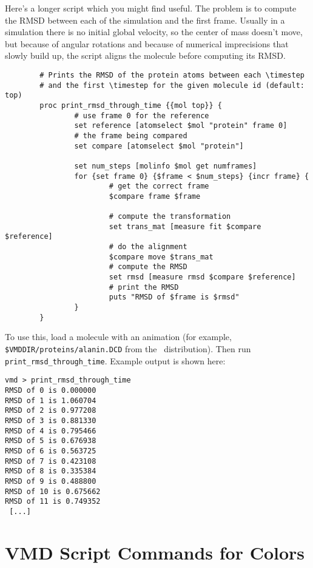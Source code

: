   Here's a longer script which you might find useful.  The problem is
to compute the RMSD between each \timestep of the simulation and the
first frame.  Usually in a simulation there is no initial global
velocity, so the center of mass doesn't move, but because of angular
rotations and because of numerical imprecisions that slowly build up,
the script aligns the molecule before computing its RMSD.

{\tt \begin{verbatim}
        # Prints the RMSD of the protein atoms between each \timestep
        # and the first \timestep for the given molecule id (default: top)
        proc print_rmsd_through_time {{mol top}} {
                # use frame 0 for the reference
                set reference [atomselect $mol "protein" frame 0]
                # the frame being compared
                set compare [atomselect $mol "protein"]

                set num_steps [molinfo $mol get numframes]
                for {set frame 0} {$frame < $num_steps} {incr frame} {
                        # get the correct frame
                        $compare frame $frame

                        # compute the transformation
                        set trans_mat [measure fit $compare $reference]
                        # do the alignment
                        $compare move $trans_mat
                        # compute the RMSD
                        set rmsd [measure rmsd $compare $reference]
                        # print the RMSD
                        puts "RMSD of $frame is $rmsd"
                }
        }
\end{verbatim}}
  To use this, load a molecule with an animation
(for example, {\tt \$VMDDIR/proteins/alanin.DCD} from the \VMD\
distribution).
Then run {\tt print\_rmsd\_through\_time}.  Example output is shown here:
{\tt \begin{verbatim}
vmd > print_rmsd_through_time
RMSD of 0 is 0.000000
RMSD of 1 is 1.060704
RMSD of 2 is 0.977208
RMSD of 3 is 0.881330
RMSD of 4 is 0.795466
RMSD of 5 is 0.676938
RMSD of 6 is 0.563725
RMSD of 7 is 0.423108
RMSD of 8 is 0.335384
RMSD of 9 is 0.488800
RMSD of 10 is 0.675662
RMSD of 11 is 0.749352
 [...]
\end{verbatim}}

\section{VMD Script Commands for Colors}
\label{ug:topic:coloring:scripts}

